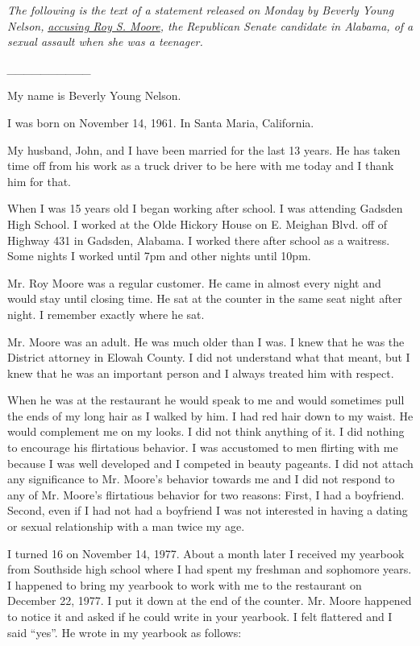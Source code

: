\emph{The following is the text of a statement released on Monday by
Beverly Young Nelson,}
\href{https://www.nytimes3xbfgragh.onion/2017/11/13/us/politics/roy-moore-alabama-senate.html}{\emph{accusing
Roy S. Moore}}\emph{, the Republican Senate candidate in Alabama, of a
sexual assault when she was a teenager.}

\emph{\_\_\_\_\_\_\_\_\_\_}

My name is Beverly Young Nelson.

I was born on November 14, 1961. In Santa Maria, California.

My husband, John, and I have been married for the last 13 years. He has
taken time off from his work as a truck driver to be here with me today
and I thank him for that.

When I was 15 years old I began working after school. I was attending
Gadsden High School. I worked at the Olde Hickory House on E. Meighan
Blvd. off of Highway 431 in Gadsden, Alabama. I worked there after
school as a waitress. Some nights I worked until 7pm and other nights
until 10pm.

Mr. Roy Moore was a regular customer. He came in almost every night and
would stay until closing time. He sat at the counter in the same seat
night after night. I remember exactly where he sat.

Mr. Moore was an adult. He was much older than I was. I knew that he was
the District attorney in Elowah County. I did not understand what that
meant, but I knew that he was an important person and I always treated
him with respect.

When he was at the restaurant he would speak to me and would sometimes
pull the ends of my long hair as I walked by him. I had red hair down to
my waist. He would complement me on my looks. I did not think anything
of it. I did nothing to encourage his flirtatious behavior. I was
accustomed to men flirting with me because I was well developed and I
competed in beauty pageants. I did not attach any significance to Mr.
Moore's behavior towards me and I did not respond to any of Mr. Moore's
flirtatious behavior for two reasons: First, I had a boyfriend. Second,
even if I had not had a boyfriend I was not interested in having a
dating or sexual relationship with a man twice my age.

I turned 16 on November 14, 1977. About a month later I received my
yearbook from Southside high school where I had spent my freshman and
sophomore years. I happened to bring my yearbook to work with me to the
restaurant on December 22, 1977. I put it down at the end of the
counter. Mr. Moore happened to notice it and asked if he could write in
your yearbook. I felt flattered and I said ``yes''. He wrote in my
yearbook as follows:

